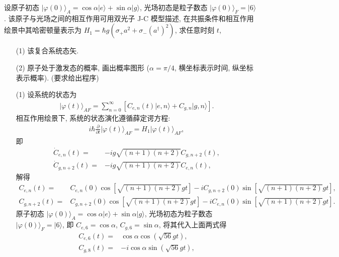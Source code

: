 \documentclass{assignment}
\begin{document}
\begin{prob}
    设原子初态 $\lvert\varphi(0)\rangle_A=\cos\alpha\lvert e\rangle+\sin\alpha\lvert g\rangle$, 光场初态是粒子数态 $\lvert\varphi(0)\rangle_F=\lvert 6\rangle$. 该原子与光场之间的相互作用可用双光子 J-C 模型描述, 在共振条件和相互作用绘景中其哈密顿量表示为 $H_1=\hbar g(\sigma_+a^2+\sigma_-(a^{\dagger})^2)$, 求任意时刻 $t$,
    \begin{itemize}
        \item[(1)] 该复合系统态矢.
        \item[(2)] 原子处于激发态的概率, 画出概率图形 ($\alpha=\pi/4$, 横坐标表示时间, 纵坐标表示概率). (要求给出程序)
    \end{itemize}
\end{prob}
\begin{sol}
    \begin{itemize}
        \item[(1)] 设系统的状态为
        \begin{align}
            \lvert\varphi(t)\rangle_{AF}=\sum_{n=0}^{\infty}[C_{e,n}(t)\lvert e,n\rangle+C_{g,n}\lvert g,n\rangle].
        \end{align}
        相互作用绘景下, 系统的状态演化遵循薛定谔方程:
        \begin{align}
            i\hbar\frac{\partial}{\partial t}\lvert\varphi(t)\rangle_{AF}=H_1\lvert\varphi(t)\rangle_{AF},
        \end{align}
        即
        \begin{align}
            \dot{C}_{e,n}(t)=&-ig\sqrt{(n+1)(n+2)}C_{g,n+2}(t),\\
            \dot{C}_{g,n+2}(t)=&-ig\sqrt{(n+1)(n+2)}C_{e,n}(t),
        \end{align}
        解得
        \begin{align}
            C_{e,n}(t)=&C_{e,n}(0)\cos[\sqrt{(n+1)(n+2)}gt]-iC_{g,n+2}(0)\sin[\sqrt{(n+1)(n+2)}gt],\\
            C_{g,n+2}(t)=&C_{g,n+2}(0)\cos[\sqrt{(n+1)(n+2)}gt]-iC_{e,n}(0)\sin[\sqrt{(n+1)(n+2)}gt].
        \end{align}
        原子初态 $\lvert\varphi(0)\rangle_A=\cos\alpha\lvert e\rangle+\sin\alpha\lvert g\rangle$, 光场初态为粒子数态 $\lvert\varphi(0)\rangle_F=\lvert 6\rangle$, 即 $C_{e,6}=\cos\alpha$, $C_{g,6}=\sin\alpha$, 将其代入上面两式得
        \begin{align}
            C_{e,6}(t)=&\cos\alpha\cos(\sqrt{56}gt),\\
            C_{g,8}(t)=&-i\cos\alpha\sin(\sqrt{56}gt),\\

\end{align}
\end{itemize}
\end{sol}
\end{document}
